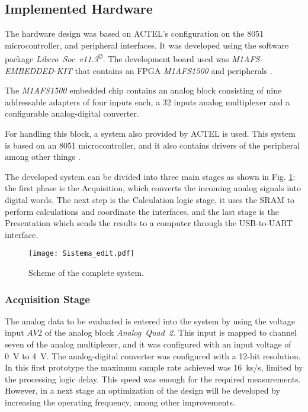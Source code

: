 \subsection{Implemented Hardware}
\label{sec:Hardware}

The hardware design was based on ACTEL's configuration on the 8051 microcontroller, and peripheral interfaces. It was developed using the software package \textit{Libero~Soc~v11.3\textsuperscript\copyright}. The development board used was \textit{M1AFS-EMBEDDED-KIT} that contains an FPGA \textit{M1AFS1500} and peripherals \cite{actelM1AFS1500}.

The \textit{M1AFS1500} embedded chip contains an analog block consisting of nine addressable adapters of four inputs each, a 32 inputs analog multiplexer and a configurable analog-digital converter.

For handling this block, a system also provided by ACTEL is used. This system is based on an 8051 microcontroller, and it  also contains drivers of the peripheral among other things \cite{Core8051sS,Core8051sH}.

The developed system can be divided into three main stages as shown in Fig. \ref{Fig:Sistema}: the first phase is the Acquisition, which converts the incoming analog signals into digital words. The next step is the Calculation logic stage, it uses the SRAM to perform calculations and coordinate the interfaces, and the last stage is the Presentation which sends the results to a computer through the USB-to-UART interface.

\begin{figure}
 \centering
 \texttt{[image: Sistema\_edit.pdf]}\\
 \caption{Scheme of the complete system.}\label{Fig:Sistema}
\end{figure}
%
\subsubsection{Acquisition Stage}
%
The analog data to be evaluated is entered into the system by using the voltage input $AV2$ of the analog block \textit{Analog~Quad~2}. 
This input is mapped to channel seven of the analog multiplexer, and it was configured with an input voltage of 0~V to 4~V.
The analog-digital converter was configured with a 12-bit resolution. In this first prototype the maximum sample rate achieved was 16~ks/s, limited by the processing logic delay. This speed was enough for the required measurements. However, in a next stage an optimization of the design will be developed by increasing the operating frequency, among other improvements.

